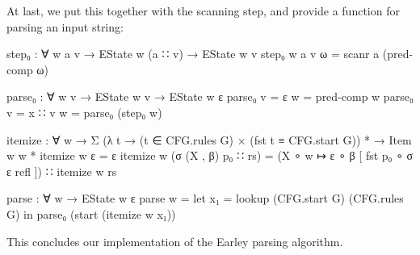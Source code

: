 		At last, we put this together with the scanning step, and provide a
		function for parsing an input string:

		\begin{code}
			  step₀ : ∀ {w a v} →
			    EState w (a ∷ v) →
			    EState w v
			  step₀ {w} {a} {v} ω = scanr a (pred-comp ω)

			  parse₀ : ∀ {w v} →
			     EState w v →
			     EState w ε
			  parse₀ {v = ε} w = pred-comp w
			  parse₀ {v = x ∷ v} w = parse₀ (step₀ w)

			  itemize : ∀ w →
			    Σ (λ t → (t ∈ CFG.rules G) × (fst t ≡ CFG.start G)) * →
			    Item w w *
			  itemize w ε = ε
			  itemize w (σ (X , β) p₀ ∷ rs) = 
			    (X ∘ w ↦ ε ∘ β [ fst p₀ ∘ σ ε refl ]) ∷ itemize w rs

			  parse : ∀ w → EState w ε
			  parse w =
			    let x₁ = lookup (CFG.start G) (CFG.rules G) in
			    parse₀ (start (itemize w x₁))
		\end{code}

		This concludes our implementation of the Earley parsing algorithm.

